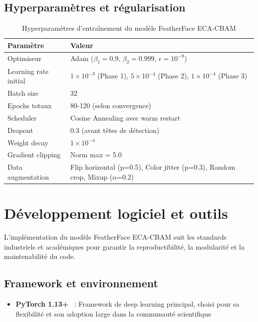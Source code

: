 \begin{onehalfspace}
\subsection{Hyperparamètres et régularisation}

\begin{table}[H]
\centering
\caption{Hyperparamètres d'entraînement du modèle FeatherFace ECA-CBAM}
\label{tab:hyperparameters}
\begin{tabularx}{\textwidth}{lX}
\hline
\textbf{Paramètre} & \textbf{Valeur} \\
\hline
Optimiseur & Adam ($\beta_1=0.9$, $\beta_2=0.999$, $\epsilon=10^{-8}$) \\
Learning rate initial & $1 \times 10^{-3}$ (Phase 1), $5 \times 10^{-4}$ (Phase 2), $1 \times 10^{-4}$ (Phase 3) \\
Batch size & 32 \\
Epochs totaux & 80-120 (selon convergence) \\
Scheduler & Cosine Annealing avec warm restart \\
Dropout & 0.3 (avant têtes de détection) \\
Weight decay & $1 \times 10^{-4}$ \\
Gradient clipping & Norm max = 5.0 \\
Data augmentation & Flip horizontal (p=0.5), Color jitter (p=0.3), Random crop, Mixup ($\alpha$=0.2) \\
\hline
\end{tabularx}
\end{table}

\section{Développement logiciel et outils}

\hspace{0.65 cm}L'implémentation du modèle FeatherFace ECA-CBAM suit les standards industriels et académiques pour garantir la reproductibilité, la modularité et la maintenabilité du code.

\subsection{Framework et environnement}

\begin{itemize}
\item \textbf{PyTorch 1.13+} \cite{Paszke2019PyTorch}~: Framework de deep learning principal, choisi pour sa flexibilité et son adoption large dans la communauté scientifique


\end{itemize}
\end{onehalfspace}
